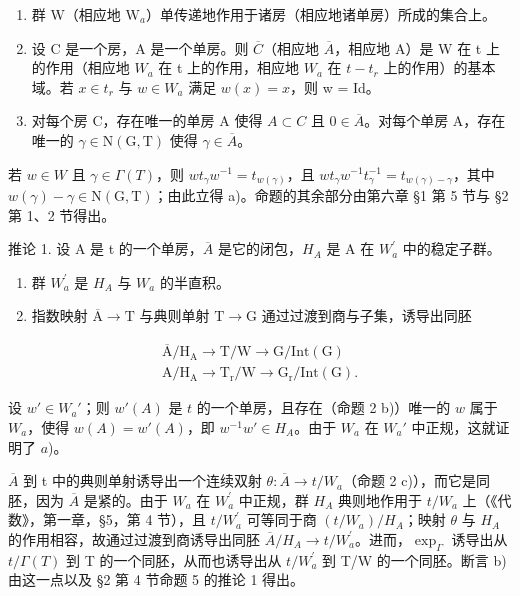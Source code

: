 \begin{enumerate}
\def\labelenumi{\alph{enumi})}
\setcounter{enumi}{1}
\item
  群 W（相应地 \(\mathrm{W}_a\)）单传递地作用于诸房（相应地诸单房）所成的集合上。
\item
  设 C 是一个房，A 是一个单房。则 \(\overline{C}\)（相应地 \(\overline{A}\)，相应地 A）是 W 在 t 上的作用（相应地 \(W_{a}\) 在 t 上的作用，相应地 \(W_{a}\) 在 \(t-t_{r}\) 上的作用）的基本域。若 \(x \in t_{r}\) 与 \(w \in W_{a}\) 满足 \(w(x) = x\)，则 w = Id。
\item
  对每个房 C，存在唯一的单房 A 使得 \(A \subset C\) 且 \(0 \in \overline{A}\)。对每个单房 A，存在唯一的 \(\gamma \in \mathrm{N}(\mathrm{G}, \mathrm{T})\) 使得 \(\gamma \in \overline{A}\)。
\end{enumerate}

若 \(w \in W\) 且 \(\gamma \in \Gamma(T)\)，则 \(wt_{\gamma}w^{-1} = t_{w(\gamma)}\)，且 \(wt_{\gamma}w^{-1}t_{\gamma}^{-1} = t_{w(\gamma)-\gamma}\)，其中 \(w(\gamma) - \gamma \in \mathrm{N}(\mathrm{G}, \mathrm{T})\)；由此立得 a)。命题的其余部分由第六章 §1 第 5 节与 §2 第 1、2 节得出。

推论 1. 设 A 是 t 的一个单房，\(\overline{A}\) 是它的闭包，\(H_{A}\) 是 A 在 \(W_{a}^{\prime}\) 中的稳定子群。

\begin{enumerate}
\def\labelenumi{\alph{enumi})}
\item
  群 \(W_{a}^{\prime}\) 是 \(H_{A}\) 与 \(W_{a}\) 的半直积。
\item
  指数映射 \(\overline{\mathrm{A}}\to \mathrm{T}\) 与典则单射 \(\mathrm{T}\rightarrow \mathrm{G}\) 通过过渡到商与子集，诱导出同胚
\end{enumerate}

\[
\begin{array}{l} \overline {{\mathrm{A}}} / \mathrm {H_ {A}} \to \mathrm{T} / \mathrm{W} \to \mathrm{G} / \mathrm{Int} (\mathrm{G}) \\ \mathrm{A} / \mathrm {H_ {A}} \to \mathrm {T_ {r}} / \mathrm{W} \to \mathrm {G_ {r}} / \mathrm{Int} (\mathrm{G}). \end{array}
\]

设 \(w' \in W_a'\)；则 \(w'(A)\) 是 \(t\) 的一个单房，且存在（命题 2 b)）唯一的 \(w\) 属于 \(W_a\)，使得 \(w(A) = w'(A)\)，即 \(w^{-1}w' \in H_A\)。由于 \(W_a\) 在 \(W_a'\) 中正规，这就证明了 \(a\))。

\(\overline{A}\) 到 t 中的典则单射诱导出一个连续双射 \(\theta: \overline{A} \to t/W_{a}\)（命题 2 c)），而它是同胚，因为 \(\overline{A}\) 是紧的。由于 \(W_{a}\) 在 \(W_{a}^{\prime}\) 中正规，群 \(H_{A}\) 典则地作用于 \(t/W_{a}\) 上（《代数》，第一章，§5，第 4 节），且 \(t/W_{a}^{\prime}\) 可等同于商 \((t/W_{a})/H_{A}\)；映射 \(\theta\) 与 \(H_{A}\) 的作用相容，故通过过渡到商诱导出同胚 \(\overline{A}/H_{A} \to t/W_{a}^{\prime}\)。进而，\(\exp_{\Gamma}\) 诱导出从 \(t/\Gamma(T)\) 到 T 的一个同胚，从而也诱导出从 \(t/W_{a}^{\prime}\) 到 T/W 的一个同胚。断言 b) 由这一点以及 §2 第 4 节命题 5 的推论 1 得出。

